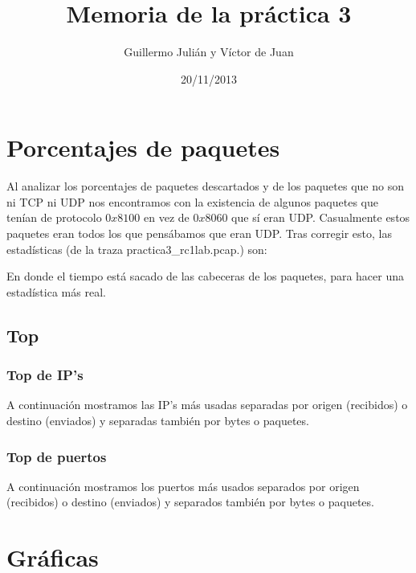 \documentclass{apuntes}
\title{Memoria de la práctica 3}
\author{Guillermo Julián y Víctor de Juan}
\date{20/11/2013}
\begin{document}
\pagestyle{plain}
\maketitle
\tableofcontents

\chapter{Porcentajes de paquetes}


Al analizar los porcentajes de paquetes descartados y de los paquetes que no son ni TCP ni UDP nos encontramos con la existencia de algunos paquetes que tenían de protocolo $0x8100$ en vez de $0x8060$ que sí eran UDP. Casualmente estos paquetes eran todos los que pensábamos que eran UDP. Tras corregir esto, las estadísticas (de la traza practica3\_rc1lab.pcap.) son:


En donde el tiempo está sacado de las cabeceras de los paquetes, para hacer una estadística más real.

\newpage
\section{Top}

\subsection{Top de IP's}

A continuación mostramos las IP's más usadas separadas por origen (recibidos) o destino (enviados) y separadas también por bytes o paquetes.

\newpage
\subsection{Top de puertos}

A continuación mostramos los puertos más usados separados por origen (recibidos) o destino (enviados) y separados también por bytes o paquetes.


\chapter{Gr\'aficas}
\end{document}
